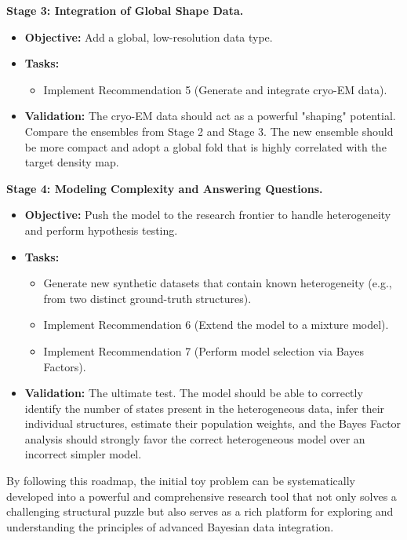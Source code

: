 \documentclass{article}
\begin{document}
\textbf{Stage 3: Integration of Global Shape Data.}

\begin{itemize}
  \item \textbf{Objective:} Add a global, low-resolution data type.
  \item \textbf{Tasks:}
    \begin{itemize}
      \item Implement Recommendation 5 (Generate and integrate cryo-EM data).
    \end{itemize}
  \item \textbf{Validation:} The cryo-EM data should act as a powerful "shaping" potential. Compare the ensembles from Stage 2 and Stage 3. The new ensemble should be more compact and adopt a global fold that is highly correlated with the target density map.
\end{itemize}

\textbf{Stage 4: Modeling Complexity and Answering Questions.}

\begin{itemize}
  \item \textbf{Objective:} Push the model to the research frontier to handle heterogeneity and perform hypothesis testing.
  \item \textbf{Tasks:}
    \begin{itemize}
      \item Generate new synthetic datasets that contain known heterogeneity (e.g., from two distinct ground-truth structures).
      \item Implement Recommendation 6 (Extend the model to a mixture model).
      \item Implement Recommendation 7 (Perform model selection via Bayes Factors).
    \end{itemize}
  \item \textbf{Validation:} The ultimate test. The model should be able to correctly identify the number of states present in the heterogeneous data, infer their individual structures, estimate their population weights, and the Bayes Factor analysis should strongly favor the correct heterogeneous model over an incorrect simpler model.
\end{itemize}

By following this roadmap, the initial toy problem can be systematically developed into a powerful and comprehensive research tool that not only solves a challenging structural puzzle but also serves as a rich platform for exploring and understanding the principles of advanced Bayesian data integration.
\end{document}
